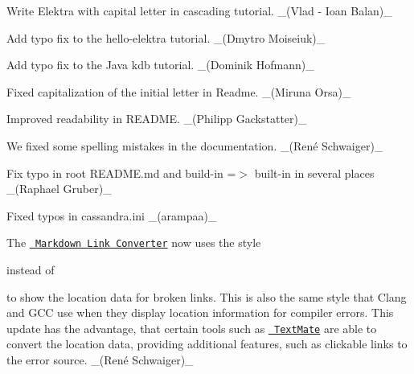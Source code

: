 \begin{DoxyItemize}
\item Write Elektra with capital letter in cascading tutorial. \+\_\+(Vlad -\/ Ioan Balan)\+\_\+
\item Add typo fix to the hello-\/elektra tutorial. \+\_\+(\+Dmytro Moiseiuk)\+\_\+
\item Add typo fix to the Java kdb tutorial. \+\_\+(\+Dominik Hofmann)\+\_\+
\item Fixed capitalization of the initial letter in Readme. \+\_\+(\+Miruna Orsa)\+\_\+
\item Improved readability in R\+E\+A\+D\+ME. \+\_\+(\+Philipp Gackstatter)\+\_\+
\item We fixed some spelling mistakes in the documentation. \+\_\+(René Schwaiger)\+\_\+
\item Fix typo in root R\+E\+A\+D\+M\+E.\+md and \textquotesingle{}build-\/in\textquotesingle{} =$>$ \textquotesingle{}built-\/in\textquotesingle{} in several places \+\_\+(\+Raphael Gruber)\+\_\+
\item Fixed typos in {\ttfamily cassandra.\+ini} \+\_\+(arampaa)\+\_\+
\end{DoxyItemize}


\begin{DoxyItemize}
\item The \href{https://master.libelektra.org/doc/markdownlinkconverter}{\texttt{ Markdown Link Converter}} now uses the style
\end{DoxyItemize}


\begin{DoxyCode}{0}
\end{DoxyCode}


instead of


\begin{DoxyCode}{0}
\end{DoxyCode}


to show the location data for broken links. This is also the same style that Clang and G\+CC use when they display location information for compiler errors. This update has the advantage, that certain tools such as \href{https://macromates.com}{\texttt{ Text\+Mate}} are able to convert the location data, providing additional features, such as clickable links to the error source. \+\_\+(René Schwaiger)\+\_\+


